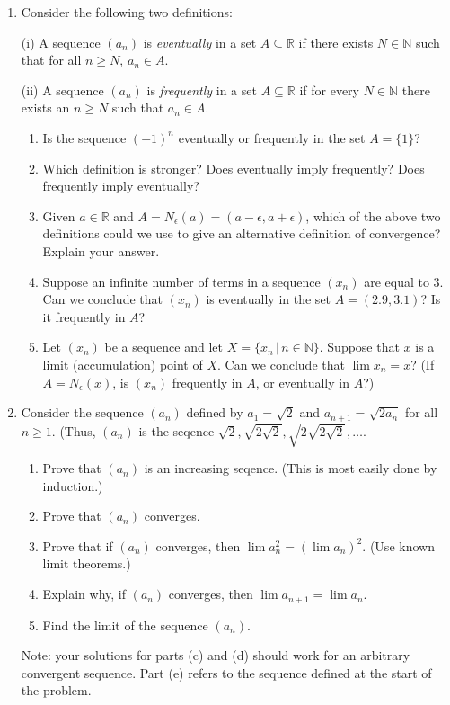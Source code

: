 \documentclass[letterpaper,12pt]{article}
\newcommand{\R}{\mathbb{R}}
\newcommand{\N}{\mathbb{N}}
\renewcommand{\ss}{\subseteq}
\begin{document}
\begin{enumerate}
 \item Consider the following two definitions:

(i) A sequence $(a_n)$ is {\em eventually} in a set $A\ss\R$ if there exists $N\in\N$ such that for all $n\geq N$, $a_n\in A$.

(ii) A sequence $(a_n)$ is {\em frequently} in a set $A\ss\R$ if for every $N\in\N$ there exists an $n\geq N$ such that $a_n\in A$.

\begin{enumerate}
 \item Is the sequence $(-1)^n$ eventually or frequently in the set $A=\{1\}$?
 \item Which definition is stronger? Does eventually imply frequently? Does frequently imply eventually?
 \item Given $a\in \R$ and $A = N_\epsilon(a) = (a-\epsilon,a+\epsilon)$, which of the above two definitions could we use to give an alternative definition of convergence? Explain your answer.
 \item Suppose an infinite number of terms in a sequence $(x_n)$ are equal to 3. Can we conclude that $(x_n)$ is eventually in the set $A=(2.9, 3.1)$? Is it frequently in $A$?
 \item Let $(x_n)$ be a sequence and let $X=\{x_n\,|\, n\in \N\}$. Suppose that $x$ is a limit (accumulation) point of $X$. Can we conclude that $\lim x_n = x$? (If $A=N_\epsilon(x)$, is $(x_n)$ frequently in $A$, or eventually in $A$?)
\end{enumerate}
  \item Consider the sequence $(a_n)$ defined by $a_1 = \sqrt{2}$ and $a_{n+1} = \sqrt{2a_n}$ for all $n\geq 1$. (Thus, $(a_n)$ is the seqence $\sqrt{2},\sqrt{2\sqrt{2}},\sqrt{2\sqrt{2\sqrt{2}}},\ldots$.
\begin{enumerate}
 \item Prove that $(a_n)$ is an increasing seqence. (This is most easily done by induction.)
 \item Prove that $(a_n)$ converges.
 \item Prove that if $(a_n)$ converges, then $\lim a_n^2 = (\lim a_n)^2$. (Use known limit theorems.)
 \item Explain why, if $(a_n)$ converges, then $\lim a_{n+1} = \lim a_n$.
 \item Find the limit of the sequence $(a_n)$.
\end{enumerate}
Note: your solutions for parts (c) and (d) should work for an arbitrary convergent sequence. Part (e) refers to the sequence defined at the start of the problem.



\end{enumerate}
\end{document}
